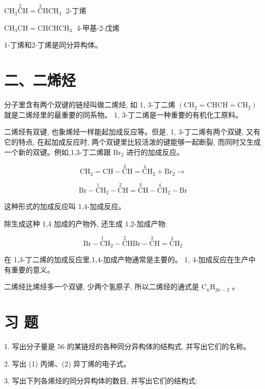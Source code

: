 \documentclass[10pt]{article}
\begin{document}
\({\mathrm{{CH}}}_{3}\overset{2}{\mathrm{C}}\mathrm{H} = \overset{3}{\mathrm{C}}{\mathrm{{HCH}}}_{3}\;\) 2-丁烯

\({\mathrm{{CH}}}_{3}\mathrm{{CH}} = {\mathrm{{CHCHCH}}}_{3}\;\) 4-甲基-2-戊烯

1-丁烯和2-丁烯是同分异构体。

\section*{二、二烯烃}

分子里含有两个双键的链烃叫做二烯烃, 如 1, 3-丁二烯 \(\left( {{\mathrm{{CH}}}_{2} = {\mathrm{{CHCH} = {CH}}}_{2}}\right)\) 就是二烯烃里的最重要的同系物。 1, 3-丁二烯是一种重要的有机化工原料。

二烯烃有双键, 也象烯烃一样能起加成反应等。但是, 1, 3-丁二烯有两个双键, 又有它的特点, 在起加成反应时, 两个双键里比较活泼的键能够一起断裂, 而同时又生成一个新的双键。例如,1,3-丁二烯跟 \({\mathrm{{Br}}}_{2}\) 进行的加成反应。

\[
{\mathrm{{CH}}}_{2} = \mathrm{{CH}} - \overset{3}{\mathrm{C}}\mathrm{H} = \overset{4}{\mathrm{C}}{\mathrm{H}}_{2} + {\mathrm{{Br}}}_{2} \rightarrow
\]

\[
\mathrm{{Br}} - \overset{1}{\mathrm{C}}{\mathrm{H}}_{2} - \overset{2}{\mathrm{C}}\mathrm{H} = \overset{3}{\mathrm{C}}\mathrm{H} - \overset{4}{\mathrm{C}}{\mathrm{H}}_{2} - \mathrm{{Br}}
\]

这种形式的加成反应叫 1,4-加成反应。

除生成这种 1,4 加成的产物外, 还生成 1,2-加成产物:

\[
\mathrm{{Br}} - \overset{1}{\mathrm{C}}{\mathrm{H}}_{2} - \overset{2}{\mathrm{C}}\mathrm{{HBr}} - \overset{3}{\mathrm{C}}\mathrm{H} = \overset{4}{\mathrm{C}}{\mathrm{H}}_{2}
\]

在 1,3-丁二烯的加成反应里,1,4-加成产物通常是主要的。 1, 4-加成反应在生产中有重要的意义。

二烯烃比烯烃多一个双键, 少两个氢原子, 所以二烯烃的通式是 \({\mathrm{C}}_{\mathrm{n}}{\mathrm{H}}_{2\mathrm{n} - 2}\) 。

\section*{习 题}

1. 写出分子量是 56 的某链烃的各种同分异构体的结构式, 并写出它们的名称。

2. 写出 (1) 丙烯、(2) 异丁烯的电子式。

3. 写出下列各烯烃的同分异构体的数目, 并写出它们的结构式:
\end{document}
